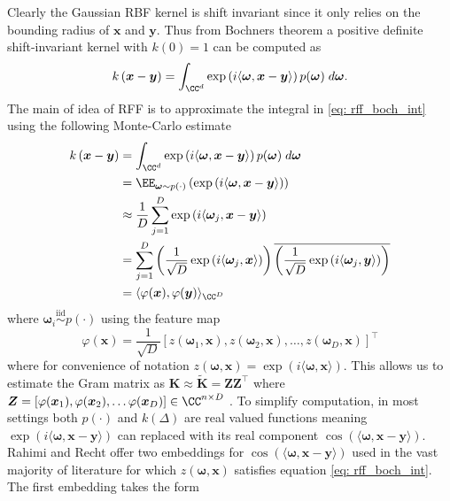 Clearly the Gaussian RBF kernel is shift invariant since it only relies on the bounding radius of $\bm{x}$ and $\bm{y}$. Thus from Bochners theorem a positive definite shift-invariant kernel with $k(0) = 1$ can be computed as
\begin{equation} \label{eq: rff_boch_int}
    k \left( \bm{x} - \bm{y} \right) = \int_{\CC^d} \exp \left( i \langle \bm{\omega} , \bm{x} - \bm{y} \rangle \right) p (\bm{\omega}) \; d \bm{\omega} .
\end{equation}
The main of idea of RFF is to approximate the integral in \ref{eq: rff_boch_int} using the following Monte-Carlo estimate
\begin{align*}
    k \left( \bm{x} - \bm{y} \right)
     & = \int_{\CC^d} \exp \left( i \langle \bm{\omega} , \bm{x} - \bm{y} \rangle \right) p (\bm{\omega}) \; d \bm{\omega}                                                                                                            \\
     & = \EE_{\bm{\omega} \sim p (\cdot)} \left( \exp \left( i \langle \bm{\omega} , \bm{x} - \bm{y} \rangle \right) \right)                                                                                                          \\
     & \approx \frac{1}{D} \sum_{j=1}^{D} \exp \left( i \langle \bm{\omega}_{j} , \bm{x} - \bm{y} \rangle \right)                                                                                                                     \\
     & = \sum_{j=1}^{D} \left( \frac{1}{\sqrt{D}} \exp \left( i \langle \bm{\omega}_{j} , \bm{x} \rangle \right) \right) \overline{\left( \frac{1}{\sqrt{D}} \exp \left( i \langle \bm{\omega}_{j} , \bm{y} \rangle \right) \right) } \\
     & = \langle \varphi (\bm{x}) , \varphi (\bm{y}) \rangle_{\CC^D}
\end{align*}
where $\bm{\omega}_i \stackrel{\text{iid}}{\sim} p(\cdot)$ using the feature map
\begin{equation}
    \varphi (\bm{x}) = \frac{1}{\sqrt{D}} \left[ z \left( \bm{\omega}_1, \bm{x} \right), z \left( \bm{\omega}_2, \bm{x} \right), \ldots , z \left( \bm{\omega}_D, \bm{x} \right) \right]^{\intercal}
\end{equation}
where for convenience of notation $z \left( \bm{\omega}, \bm{x} \right) = \exp \left( i \langle \bm{\omega} , \bm{x} \rangle \right)$. This allows us to estimate the Gram matrix as $\bm{K} \approx \bm{\widetilde{K}} = \bm{Z} \bm{Z}^{\intercal}$ where $\bm{Z} = \left[ \varphi (\bm{x}_1), \varphi (\bm{x}_2), \ldots \varphi (\bm{x}_D) \right] \in \CC^{n \times D}$ \cite{NIPS2007_013a006f,LiuFanghui2021RFfK,JMLR:v17:14-538}. To simplify computation, in most settings both $p(\cdot)$ and $k(\Delta)$ are real valued functions meaning $\exp \left( i \langle \bm{\omega} , \bm{x} - \bm{y} \rangle \right)$ can replaced with its real component $\cos \left( \langle \bm{\omega} , \bm{x} - \bm{y} \rangle \right)$. Rahimi and Recht offer two embeddings for $\cos \left( \langle \bm{\omega} , \bm{x} - \bm{y} \rangle \right)$ used in the vast majority of literature for which $z \left( \bm{\omega}, \bm{x} \right)$ satisfies equation \ref{eq: rff_boch_int}. The first embedding takes the form
